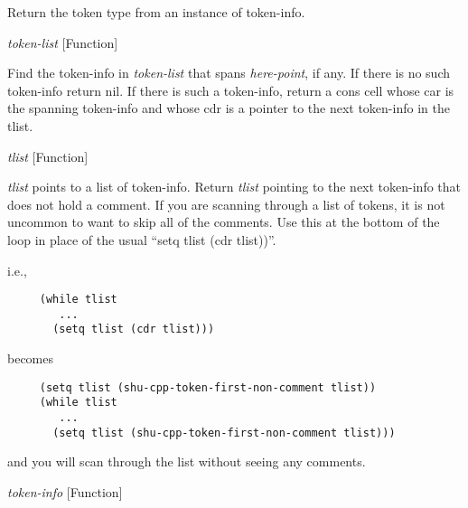 \begin{doc-string}
Return the token type from an instance of token-info.
\end{doc-string}

\vspace{1em}
\noindent
{}
\usebox{\funcname}\emph{token-list}
 \hfill [Function]
\hspace*{\wd\funcname}

\begin{doc-string}
Find the token-info in \emph{token-list} that spans \emph{here-point}, if any.  If there
is no such token-info return nil.  If there is such a token-info, return a
cons cell whose car is the spanning token-info and whose cdr is a pointer
to the next token-info in the tlist.
\end{doc-string}

\vspace{1em}
\noindent
{}
\usebox{\funcname}\emph{tlist}
 \hfill [Function]

\begin{doc-string}
\emph{tlist} points to a list of token-info.  Return \emph{tlist} pointing to the next
token-info that does not hold a comment.  If you are scanning through a list
of tokens, it is not uncommon to want to skip all of the comments.  Use this
at the bottom of the loop in place of the usual ``setq tlist (cdr tlist))''.

i.e.,

\small{\begin{verbatim}
     (while tlist
        ...
       (setq tlist (cdr tlist)))
\end{verbatim}}

becomes

\small{\begin{verbatim}
     (setq tlist (shu-cpp-token-first-non-comment tlist))
     (while tlist
        ...
       (setq tlist (shu-cpp-token-first-non-comment tlist)))
\end{verbatim}}

and you will scan through the list without seeing any comments.
\end{doc-string}

\vspace{1em}
\noindent
{}
\usebox{\funcname}\emph{token-info}
 \hfill [Function]
\hspace*{\wd\funcname}

